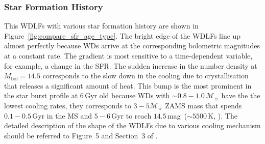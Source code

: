\documentclass[fleqn,usenatbib]{rasti}
\newcommand{\msun}{\mathcal{M}_{\sun}}
\begin{document}
\subsubsection{Star Formation History}
This WDLFs with various star formation history are shown in
Figure~\ref{fig:compare_sfr_age_type}. The bright edge of the WDLFs line up
almost perfectly because WDs arrive at the corresponding bolometric magnitudes
at a constant rate. The gradient is most sensitive to a time-dependent
variable, for example, a change in the SFR. The sudden increase in the number
density at $M_\mathrm{bol}=14.5$ corresponds to the slow down in the cooling
due to crystallisation that releases a significant amount of heat. This bump
is the most prominent in the star burst profile at $6$\,Gyr old because WDs
with $\sim0.8-1.0\,\msun$ have the the lowest cooling rates, they corresponds
to $3-5\msun$ ZAMS mass that spends $0.1-0.5$\,Gyr in the MS and $5-6$\,Gyr
to reach $14.5$\,mag~($\sim 5500$\,K, \citealp{2019ApJ...876...67B}). The
detailed description of the shape of the WDLFs due to various cooling
mechanism should be referred to  Figure~5 and Section~3
of \citep{2001PASP..113..409F}.
\end{document}
